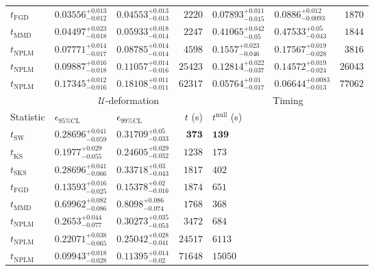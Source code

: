 \begin{tabular}{l|llr|llr}
	$t_{\mathrm{FGD}}$ & $0.03556_{-0.012}^{+0.013}$ & $0.04553_{-0.013}^{+0.013}$ & $2220$ & ${\mathbf{0.07893_{-0.015}^{+0.011}}}$ & ${\mathbf{0.0886_{-0.0093}^{+0.012}}}$ & $1870$ \\
	$t_{\mathrm{MMD}}$ & $0.04497_{-0.018}^{+0.023}$ & $0.05933_{-0.014}^{+0.018}$ & $2247$ & $0.41065_{-0.05}^{+0.042}$ & $0.47533_{-0.043}^{+0.05}$ & $1844$ \\
\rowcolor{red!35}	$t_{\mathrm{NPLM}}$ & $0.07771_{-0.017}^{+0.014}$ & $0.08785_{-0.014}^{+0.014}$ & $4598$ & $0.1557_{-0.046}^{+0.023}$ & $0.17567_{-0.028}^{+0.019}$ & $3816$ \\
\rowcolor{blue!35}	$t_{\mathrm{NPLM}}$ & $0.09887_{-0.018}^{+0.016}$ & $0.11057_{-0.016}^{+0.014}$ & $25423$ & $0.12814_{-0.037}^{+0.022}$ & $0.14572_{-0.024}^{+0.019}$ & $26043$ \\
\rowcolor{green!35}	$t_{\mathrm{NPLM}}$ & $0.17345_{-0.016}^{+0.012}$ & $0.18108_{-0.011}^{+0.011}$ & $62317$ & $0.05764_{-0.017}^{+0.01}$ & $0.06644_{-0.013}^{+0.0083}$ & $77062$ \\
	\toprule
	\multicolumn{1}{c}{} & \multicolumn{3}{c}{$\mathcal{U}$-deformation} & \multicolumn{3}{c}{Timing} \\
Statistic & $\epsilon_{95\%\mathrm{CL}}$ & $\epsilon_{99\%\mathrm{CL}}$ & $t$ (s) & $t^{\mathrm{null}}$ (s) \\
	\midrule
	$t_{\mathrm{SW}}$ & $0.28696_{-0.059}^{+0.041}$ & $0.31709_{-0.033}^{+0.05}$ & ${\mathbf{373}}$ & ${\mathbf{139}}$ \\
	$t_{\overline{\mathrm{KS}}}$ & $0.1977_{-0.055}^{+0.029}$ & $0.24605_{-0.032}^{+0.029}$ & $1238$ & $173$ \\
	$t_{\mathrm{SKS}}$ & $0.28696_{-0.066}^{+0.041}$ & $0.33718_{-0.043}^{+0.03}$ & $1817$ & $402$ \\
	$t_{\mathrm{FGD}}$ & ${\mathbf{0.13593_{-0.025}^{+0.016}}}$ & ${\mathbf{0.15378_{-0.016}^{+0.02}}}$ & $1874$ & $651$ \\
	$t_{\mathrm{MMD}}$ & $0.69962_{-0.086}^{+0.082}$ & $0.8098_{-0.074}^{+0.086}$ & $1768$ & $368$ \\
\rowcolor{red!35}	$t_{\mathrm{NPLM}}$ & $0.2653_{-0.077}^{+0.044}$ & $0.30273_{-0.053}^{+0.035}$ & $3472$ & $684$ \\
\rowcolor{blue!35}	$t_{\mathrm{NPLM}}$ & $0.22071_{-0.065}^{+0.038}$ & $0.25042_{-0.041}^{+0.028}$ & $24517$ & $6113$ \\
\rowcolor{green!35}	$t_{\mathrm{NPLM}}$ & $0.09943_{-0.028}^{+0.018}$ & $0.11395_{-0.02}^{+0.014}$ & $71648$ & $15050$ \\
	\bottomrule
\end{tabular}